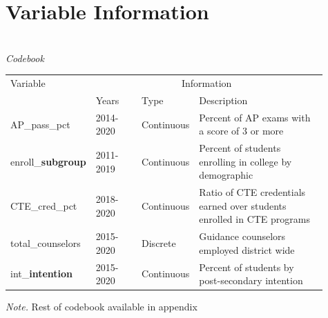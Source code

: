 \documentclass[10pt]{beamer}
\begin{document}
\section[Variable Information]{Variable Information}




\begin{frame}
    \begin{threeparttable}
        \caption{\\\textit{Codebook}}
        \begin{tabular}{ p{0.2\linewidth} p{0.15\linewidth} p{0.13\linewidth} p{0.43\linewidth}}
            \toprule
            Variable & \multicolumn{3}{c}{Information} \\
            \cmidrule(r){2-4}
            &   Years    &    Type                 &  Description \\ 
            \midrule
            AP\_pass\_pct & 2014-2020 &  Continuous     &   Percent of AP exams with a score of 3 or more     \\
            enroll\_\textbf{subgroup}& 2011-2019   &  Continuous     &   Percent of students enrolling in college by demographic           \\
            CTE\_cred\_pct  & 2018-2020  &  Continuous     &  Ratio of CTE credentials earned over students enrolled in CTE programs          \\
            total\_counselors & 2015-2020  &  Discrete       &  Guidance counselors employed district wide  \\
            int\_\textbf{intention} & 2015-2020 &  Continuous                   &  Percent of students by post-secondary intention           \\
            \midrule
        \end{tabular}
        \small \emph{Note.} Rest of codebook available in appendix 
        \end{threeparttable}
\end{frame}
\end{document}
